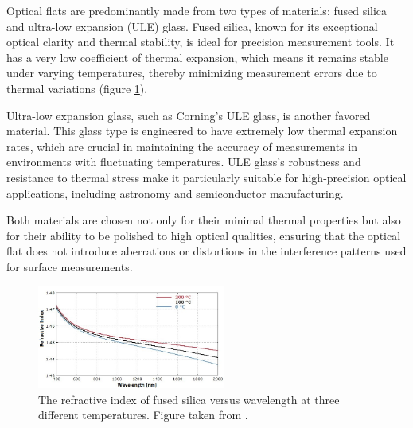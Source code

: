 \documentclass[../main.tex]{subfiles}
\begin{document}
\vspace{-10pt}

Optical flats are predominantly made from two types of materials: fused silica and ultra-low expansion (ULE) glass. Fused silica, known for its exceptional optical clarity and thermal stability, is ideal for precision measurement tools. It has a very low coefficient of thermal expansion, which means it remains stable under varying temperatures, thereby minimizing measurement errors due to thermal variations (figure \ref{fig:refractive_index_silica}). \cite{Paschottafused_silica}

Ultra-low expansion glass, such as Corning's ULE glass, is another favored material. This glass type is engineered to have extremely low thermal expansion rates, which are crucial in maintaining the accuracy of measurements in environments with fluctuating temperatures. ULE glass's robustness and resistance to thermal stress make it particularly suitable for high-precision optical applications, including astronomy and semiconductor manufacturing. \cite{Corning_2022}

Both materials are chosen not only for their minimal thermal properties but also for their ability to be polished to high optical qualities, ensuring that the optical flat does not introduce aberrations or distortions in the interference patterns used for surface measurements. \cite{Corning_2022,Paschottafused_silica,doi:https://doi.org/10.1002/9780470135976.ch1}

\vspace{-12pt}


\begin{figure}[H]
    \centering
    \includegraphics[width=0.55\textwidth]{Images/Introduction/silica_refractive_index2}
    \vspace{-8pt}
    \caption{The refractive index of fused silica versus wavelength at three different temperatures. Figure taken from \cite{Paschottafused_silica}.}
    \label{fig:refractive_index_silica}
\end{figure}

\vspace{-25pt}
\end{document}
